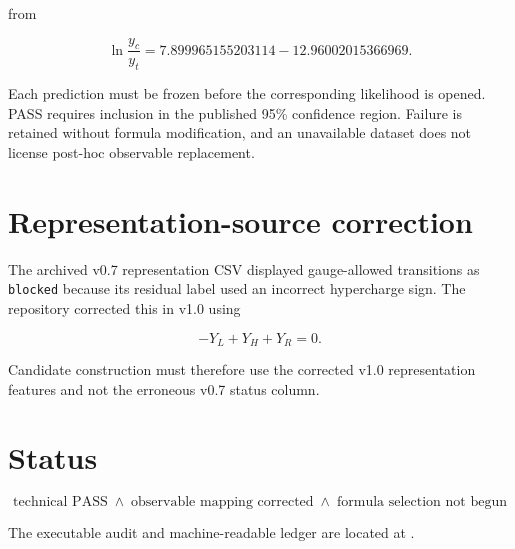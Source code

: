 from

\[
\ln\frac{y_c}{y_t}
=7.899965155203114-12.96002015366969.
\]

Each prediction must be frozen before the corresponding likelihood is opened.
PASS requires inclusion in the published 95\% confidence region.  Failure is
retained without formula modification, and an unavailable dataset does not
license post-hoc observable replacement.

\section{Representation-source correction}

The archived v0.7 representation CSV displayed gauge-allowed transitions as
\texttt{blocked} because its residual label used an incorrect hypercharge sign.
The repository corrected this in v1.0 using

\begin{equation}
-Y_L+Y_H+Y_R=0.
\end{equation}

Candidate construction must therefore use the corrected v1.0 representation
features and not the erroneous v0.7 status column.

\section{Status}

\[
\boxed{
\text{technical PASS}
\;\land\;
\text{observable mapping corrected}
\;\land\;
\text{formula selection not begun}
}
\]

The executable audit and machine-readable ledger are located at
.
